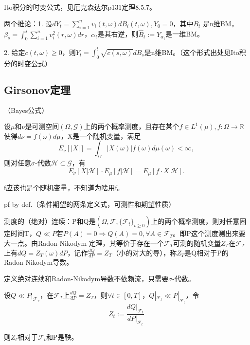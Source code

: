Ito积分的时变公式，见厄克森达尔p131定理8.5.7。

两个推论：1. 设$d Y_{t}=\sum_{i=1}^{n} v_{i}(t, \omega) d B_{i}(t, \omega), Y_{0}=0$，其中$B_t$  是n维BM，$\beta_{s}=\int_{0}^{s} \sum_{i=1}^{n} v_{i}^{2}(r, \omega) d r$，$\alpha_t$是其右逆，则$\widehat{B}_{t}:=Y_{\alpha_{t}}$是一维BM。

2. 给定$c(t, \omega) \geq 0$，则$Y_{t}=\int_{0}^{t} \sqrt{c(s, \omega)} d B_{s}$是n维BM。（这个形式出处见Ito积分的时变公式）

\subsection{Girsonov定理}

\begin{lem}（Bayes公式）

  设$\mu$和$\nu$是可测空间$(\Omega, \mathcal{G})$上的两个概率测度，且存在某个$f \in L^{1}(\mu), f: \Omega \to \mathbb{R}$使得$d \nu=f(\omega) d \mu$，X是一个随机变量，满足
  \[
    E_{\nu}[|X|]=\int_{\Omega}|X(\omega)| f(\omega) d \mu(\omega)<\infty,
  \]
  则对任意$\sigma$-代数$\mathcal{H} \subset \mathcal{G}$，有
  \[
    E_{\nu}[X | \mathcal{H}] \cdot E_{\mu}[f | \mathcal{H}]=E_{\mu}[f \cdot X | \mathcal{H}].
  \]
\end{lem}

f应该也是个随机变量，不知道为啥用f。

pf by def.（条件期望的两条定义式，可测性和期望性质）

测度的（绝对）连续：P和Q是$(\Omega, \mathcal{F}, \{\mathcal{F}_t\}_{t \ge 0})$上的两个概率测度，则对任意固定时间T，$Q \ll P$若$P(A) = 0 \Rightarrow Q(A) = 0, \forall A \in \mathcal{F}_T$。即P这个测度测出来要大一点。由Radon-Nikodym 定理，其等价于存在一个$\mathcal{F}_{T}$可测的随机变量$Z_{T}$在$\mathcal{F}_{T}$上有$d Q=Z_{T}(\omega) d P$，记作$\frac{d Q}{d P}=Z_{T}$（小的对大的导），称$Z_{T}$是Q相对于P的Radon-Nikodym导数。

定义绝对连续和Radon-Nikodym导数不依赖流，只需要$\sigma$-代数。

\begin{lem}
  设$Q \ll P|_{\mathcal{F}_{T}}$，在$\mathcal{F}_{T}$上$\frac{d Q}{d P}=Z_{T}$，则$\forall t \in[0, T]$，$Q|_{\mathcal{F}_{t}} \ll P|_{\mathcal{F}_{t}}$，令
  \[
    Z_{t}:=\frac{\left.d Q\right|_{\mathcal{F}_{t}}}{\left.d P\right|_{\mathcal{F}_{t}}}
  \]

  则$Z_{t}$相对于$\mathcal{F}_{t}$和P是鞅。
\end{lem}

